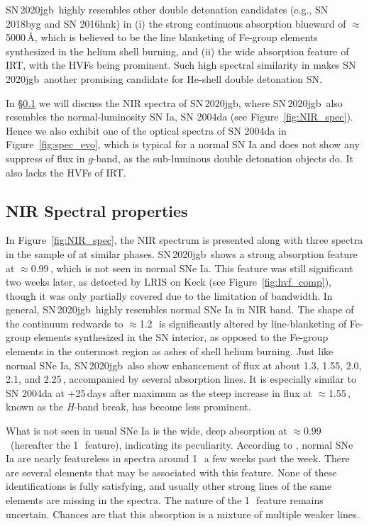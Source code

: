 \documentclass[twocolumn]{aastex631}
\newcommand\sn{SN\,2020jgb}
\begin{document}
\sn\ highly resembles other double detonation candidates (e.g., SN 2018byg and SN 2016hnk) in (i) the strong continuous absorption blueward of $\approx$5000\,\r{A}, which is believed to be the line blanketing of Fe-group elements synthesized in the helium shell burning, and (ii) the wide absorption feature of  IRT, with the HVFs being prominent. Such high spectral similarity in makes \sn\ another promising candidate for He-shell double detonation SN.

In \S\ref{sec:NIR_spec} we will discuss the NIR spectra of \sn, where \sn\ also resembles the normal-luminosity SN Ia, SN 2004da (see Figure~\ref{fig:NIR_spec}). Hence we also exhibit one of the optical spectra of SN 2004da in Figure~\ref{fig:spec_evo}, which is typical for a normal SN Ia and does not show any suppress of flux in $g$-band, as the sub-luminous double detonation objects do. It also lacks the HVFs of  IRT.

\subsection{NIR Spectral properties}
\label{sec:NIR_spec}
In Figure~\ref{fig:NIR_spec}, the NIR spectrum is presented along with three spectra in the sample of \cite{Marion2009_NIR} at similar phases. \sn\ shows a strong absorption feature at $\approx$0.99\,\micron, which is not seen in normal SNe Ia. This feature was still significant two weeks later, as detected by LRIS on Keck (see Figure~\ref{fig:hvf_comp}), though it was only partially covered due to the limitation of bandwidth. In general, \sn\ highly resembles normal SNe Ia in NIR band. The shape of the continuum redwards to $\approx$1.2\,\micron\ is significantly altered by line-blanketing of Fe-group elements synthesized in the SN interior, as opposed to the Fe-group elements in the outermost region as ashes of shell helium burning. Just like normal SNe Ia, \sn\ also show enhancement of flux at about 1.3, 1.55, 2.0, 2.1, and 2.25\,\micron, accompanied by several  absorption lines. It is especially similar to SN 2004da at +25\,days after maximum as the steep increase in flux at $\approx$1.55\,\micron, known as the \textit H-band break, has become less prominent. %

What is not seen in usual SNe Ia is the wide, deep absorption at $\approx$0.99\,\micron\ (hereafter the 1\,\micron\ feature), indicating its peculiarity. According to \citet{Marion2009_NIR}, normal SNe Ia are nearly featureless in spectra around 1\,\micron\ a few weeks past the week. There are several elements that may be associated with this feature. None of these identifications is fully satisfying, and usually other strong lines of the same elements are missing in the spectra. The nature of the 1\,\micron\ feature remains uncertain. Chances are that this absorption is a mixture of multiple weaker lines.
\end{document}
